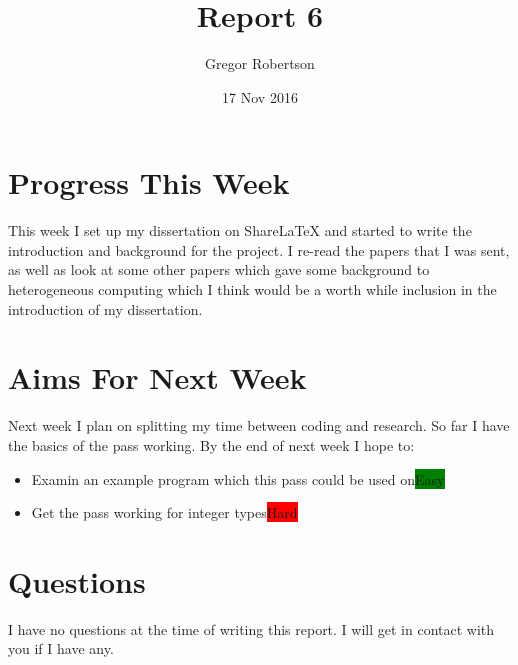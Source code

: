 \documentclass{article}
\title{Report 6}
\author{Gregor Robertson}
\date{17 Nov 2016}
\begin{document}
 
\maketitle
 
\section*{Progress This Week}
This week I set up my dissertation on ShareLaTeX and started to write the introduction and background for the project. I re-read the papers that I was sent, as well as look at some other papers which gave some background to heterogeneous computing which I think would be a worth while inclusion in the introduction of my dissertation. 

\section*{Aims For Next Week}
Next week I plan on splitting my time between coding and research. So far I have the basics of the pass working. By the end of next week I hope to:
\begin{itemize}
	\item Examin an example program which this pass could be used on\colorbox{Green}{\color{Black}Easy}
	\item Get the pass working for integer types\colorbox{Red}{\color{Black}Hard}
\end{itemize}

\section*{Questions}
I have no questions at the time of writing this report. I will get in contact with you if I have any. 

\medskip
 
\printbibliography
\end{document}
